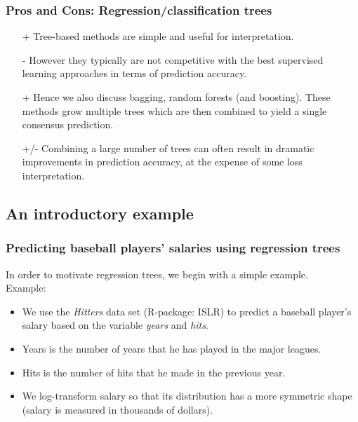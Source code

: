 \documentclass{beamer}
\begin{document}
\begin{frame}\frametitle{Pros and Cons: Regression/classification trees}
	\begin{itemize}
	  \item[+] Tree-based methods are simple and useful for
interpretation.
\vspace*{0.2cm}
	  \item[-] However they typically are not competitive with the best
supervised learning approaches in terms of prediction
accuracy.
\vspace*{0.2cm}
\item[+] Hence we also discuss bagging, random forests (and
boosting). These methods grow multiple trees which are
then combined to yield a single consensus prediction.
\vspace*{0.2cm}
\item[+/-] Combining a large number of trees can often result in
dramatic improvements in prediction accuracy, at the
expense of some loss interpretation.
	\end{itemize}
\end{frame}

\subsection{An introductory example}
\begin{frame}\frametitle{Predicting baseball players' salaries using regression trees}
In order to motivate regression trees, we begin with a simple example.\\
Example:\\
\vspace*{0.2cm}
	\begin{itemize}
	  \item We use the \textit{Hitters} data set (R-package: ISLR) to predict a baseball player's salary based on
the variable \textit{years} and
\textit{hits}.
\vspace*{0.2cm}
\item Years is the number of years that he has played in the major leagues.
\vspace*{0.2cm}
\item Hits is the number of hits that he made in the previous year.
\vspace*{0.2cm}
\item We log-transform salary so
that its distribution has a more symmetric shape (salary is measured in thousands of dollars).
	\end{itemize}
\end{frame}
\end{document}
